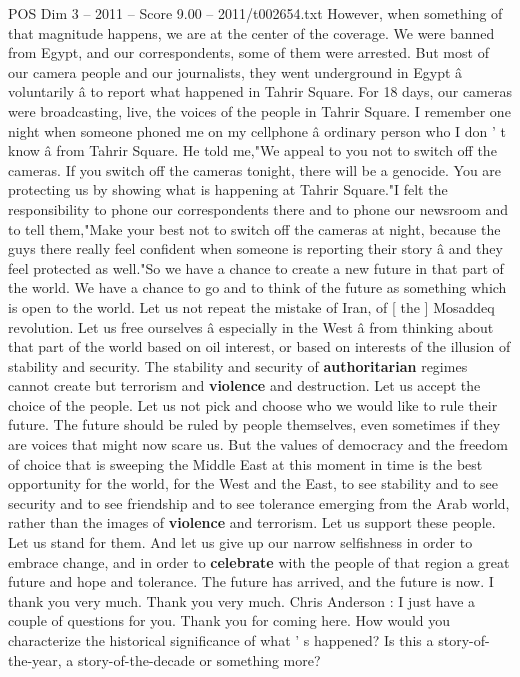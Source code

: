 \begin{textsample}{POS Dim 3 – 2011 – Score 9.00 – 2011/t002654.txt}
However, when something of that magnitude happens, we are at the center of the coverage.
We were banned from Egypt, and our correspondents, some of them were arrested.
But most of our camera people and our journalists, they went underground in Egypt â voluntarily â to report what happened in Tahrir Square.
For 18 days, our cameras were broadcasting, live, the voices of the people in Tahrir Square.
I remember one night when someone phoned me on my cellphone â ordinary person who I don ' t know â from Tahrir Square.
He told me,"We appeal to you not to switch off the cameras.
If you switch off the cameras tonight, there will be a genocide.
You are protecting us by showing what is happening at Tahrir Square."I felt the responsibility to phone our correspondents there and to phone our newsroom and to tell them,"Make your best not to switch off the cameras at night, because the guys there really feel confident when someone is reporting their story â and they feel protected as well."So we have a chance to create a new future in that part of the world.
We have a chance to go and to think of the future as something which is open to the world.
Let us not repeat the mistake of Iran, of [ the ] Mosaddeq revolution.
Let us free ourselves â especially in the West â from thinking about that part of the world based on oil interest, or based on interests of the illusion of stability and security.
The stability and security of \textbf{authoritarian} regimes cannot create but terrorism and \textbf{violence} and destruction.
Let us accept the choice of the people.
Let us not pick and choose who we would like to rule their future.
The future should be ruled by people themselves, even sometimes if they are voices that might now scare us.
But the values of democracy and the freedom of choice that is sweeping the Middle East at this moment in time is the best opportunity for the world, for the West and the East, to see stability and to see security and to see friendship and to see tolerance emerging from the Arab world, rather than the images of \textbf{violence} and terrorism.
Let us support these people.
Let us stand for them.
And let us give up our narrow selfishness in order to embrace change, and in order to \textbf{celebrate} with the people of that region a great future and hope and tolerance.
The future has arrived, and the future is now.
I thank you very much.
Thank you very much.
Chris Anderson : I just have a couple of questions for you.
Thank you for coming here.
How would you characterize the historical significance of what ' s happened?
Is this a story-of-the-year, a story-of-the-decade or something more?

\end{textsample}
